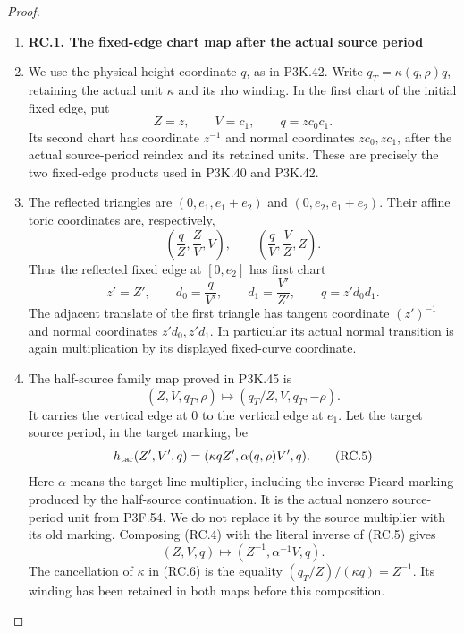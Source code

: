 \begin{proof}
\begin{enumerate}[label=\arabic*.]
\item \par

\medskip\noindent\textbf{RC.1. The fixed-edge chart map after the actual source period}

\par\nobreak

\item We use the physical height coordinate \(q\), as in P3K.42. Write
\(q_T=\kappa(q,\rho)q\), retaining the actual unit \(\kappa\) and its
rho winding. In the first chart of the initial fixed edge, put
\[
 Z=z,\qquad V=c_1,\qquad q=z c_0c_1.                 \tag{RC.1}
\]
Its second chart has coordinate \(z^{-1}\) and normal coordinates
\(z c_0,z c_1\), after the actual source-period reindex and its
retained units. These are precisely the two fixed-edge products used
in P3K.40 and P3K.42.

\item The reflected triangles are
\((0,e_1,e_1+e_2)\) and \((0,e_2,e_1+e_2)\). Their affine toric
coordinates are, respectively,
\[
 \left(\frac qZ,\frac ZV,V\right),\qquad
 \left(\frac qV,\frac VZ,Z\right).                  \tag{RC.2}
\]
Thus the reflected fixed edge at \([0,e_2]\) has first chart
\[
 z'=Z',\qquad d_0=\frac q{V'},\qquad
 d_1=\frac{V'}{Z'},\qquad q=z'd_0d_1.              \tag{RC.3}
\]
The adjacent translate of the first triangle has tangent coordinate
\((z')^{-1}\) and normal coordinates \(z'd_0,z'd_1\).
In particular its actual normal transition is again multiplication
by its displayed fixed-curve coordinate.

\item The half-source family map proved in P3K.45 is
\[
 (Z,V,q_T,\rho)\longmapsto(q_T/Z,V,q_T,-\rho).
                                                               \tag{RC.4}
\]
It carries the vertical edge at \(0\) to the vertical edge at \(e_1\).
Let the target source period, in the target marking, be
\[
 h_{\rm tar}(Z',V',q)
       =(\kappa qZ',\alpha(q,\rho)V',q).             \tag{RC.5}
\]
Here \(\alpha\) means the target line multiplier, including the inverse
Picard marking produced by the half-source continuation. It is the
actual nonzero source-period unit from P3F.54. We do not replace it by
the source multiplier with its old marking. Composing (RC.4) with the
literal inverse of (RC.5) gives
\[
       (Z,V,q)\longmapsto(Z^{-1},\alpha^{-1}V,q).
                                                               \tag{RC.6}
\]
The cancellation of \(\kappa\) in (RC.6) is the equality
\((q_T/Z)/(\kappa q)=Z^{-1}\). Its winding has been retained in both
maps before this composition.


\end{enumerate}
\end{proof}
